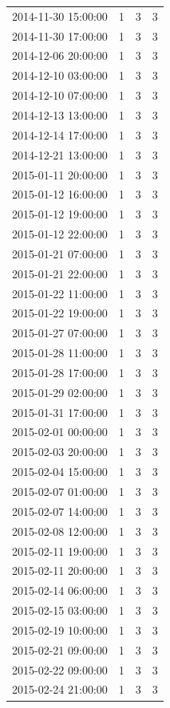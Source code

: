 \begin{tabular}{lrrr}
2014-11-30 15:00:00 & 1 & 3 & 3 \\
2014-11-30 17:00:00 & 1 & 3 & 3 \\
2014-12-06 20:00:00 & 1 & 3 & 3 \\
2014-12-10 03:00:00 & 1 & 3 & 3 \\
2014-12-10 07:00:00 & 1 & 3 & 3 \\
2014-12-13 13:00:00 & 1 & 3 & 3 \\
2014-12-14 17:00:00 & 1 & 3 & 3 \\
2014-12-21 13:00:00 & 1 & 3 & 3 \\
2015-01-11 20:00:00 & 1 & 3 & 3 \\
2015-01-12 16:00:00 & 1 & 3 & 3 \\
2015-01-12 19:00:00 & 1 & 3 & 3 \\
2015-01-12 22:00:00 & 1 & 3 & 3 \\
2015-01-21 07:00:00 & 1 & 3 & 3 \\
2015-01-21 22:00:00 & 1 & 3 & 3 \\
2015-01-22 11:00:00 & 1 & 3 & 3 \\
2015-01-22 19:00:00 & 1 & 3 & 3 \\
2015-01-27 07:00:00 & 1 & 3 & 3 \\
2015-01-28 11:00:00 & 1 & 3 & 3 \\
2015-01-28 17:00:00 & 1 & 3 & 3 \\
2015-01-29 02:00:00 & 1 & 3 & 3 \\
2015-01-31 17:00:00 & 1 & 3 & 3 \\
2015-02-01 00:00:00 & 1 & 3 & 3 \\
2015-02-03 20:00:00 & 1 & 3 & 3 \\
2015-02-04 15:00:00 & 1 & 3 & 3 \\
2015-02-07 01:00:00 & 1 & 3 & 3 \\
2015-02-07 14:00:00 & 1 & 3 & 3 \\
2015-02-08 12:00:00 & 1 & 3 & 3 \\
2015-02-11 19:00:00 & 1 & 3 & 3 \\
2015-02-11 20:00:00 & 1 & 3 & 3 \\
2015-02-14 06:00:00 & 1 & 3 & 3 \\
2015-02-15 03:00:00 & 1 & 3 & 3 \\
2015-02-19 10:00:00 & 1 & 3 & 3 \\
2015-02-21 09:00:00 & 1 & 3 & 3 \\
2015-02-22 09:00:00 & 1 & 3 & 3 \\
2015-02-24 21:00:00 & 1 & 3 & 3 \\

\end{tabular}
